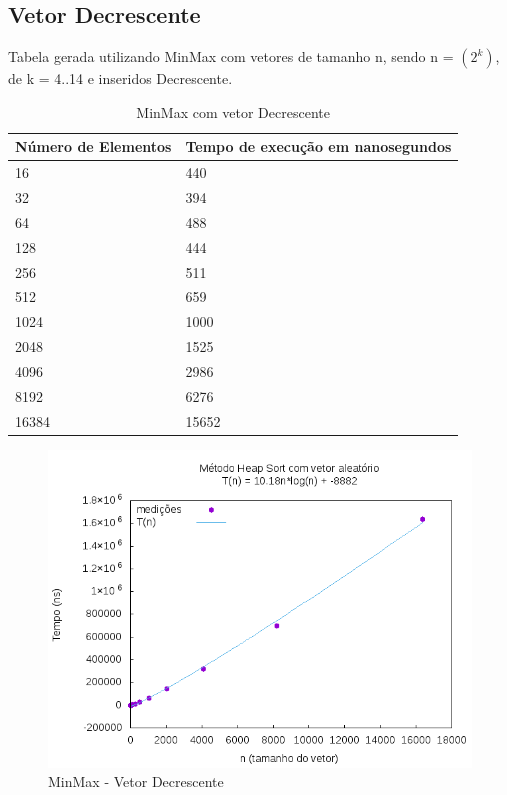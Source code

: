 \documentclass[12pt,a4paper,twoside]{report}
\begin{document}
\subsection{Vetor Decrescente}
Tabela gerada utilizando MinMax com vetores de tamanho n, sendo n = $(2^k)$, de k = 4..14 e inseridos Decrescente.
\begin{table}[H]
\centering
\caption{MinMax com vetor Decrescente}
\label{my-label}
\begin{tabular}{|l|l|}
\hline
\multicolumn{1}{|c|}{\textbf{Número de Elementos}} & \multicolumn{1}{c|}{\textbf{Tempo de execução em nanosegundos}} \\ \hline
16 & 440 \\ \hline
32 & 394 \\ \hline
64 & 488 \\ \hline
128 & 444 \\ \hline
256 & 511 \\ \hline
512 & 659 \\ \hline
1024 & 1000 \\ \hline
2048 & 1525 \\ \hline
4096 & 2986 \\ \hline
8192 & 6276 \\ \hline
16384 & 15652 \\ \hline
\end{tabular}
\end{table}

\begin{figure}[H]
    \centering
    \includegraphics[width=0.7\linewidth]{graficos/HeapSort/vIntAleatorio/vIntAleatorio.png}
  \caption{MinMax - Vetor Decrescente}
\end{figure}
\end{document}
